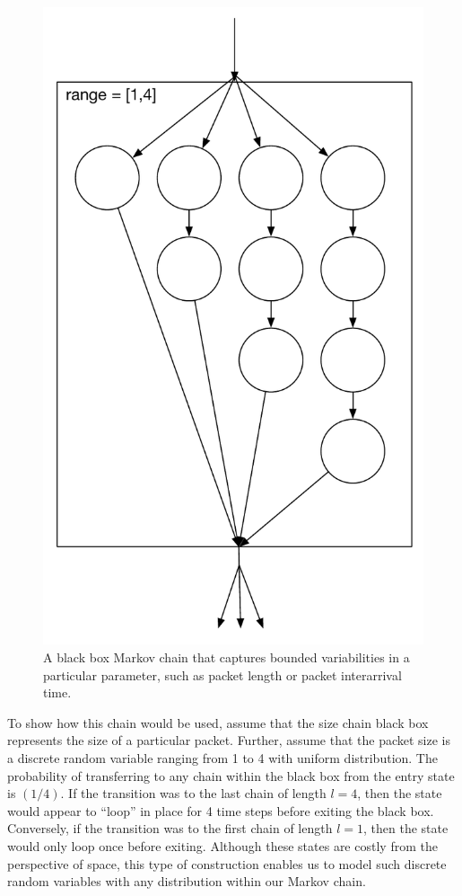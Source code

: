 \documentclass{llncs}
\begin{document}
\begin{figure}
\begin{center}
\includegraphics[scale=0.35]{../../sketches/size_chain_old.pdf}
\caption{A black box Markov chain that captures bounded variabilities in a particular parameter, such as packet length or packet interarrival time.}
\label{fig:size_chain}
\end{center}
\end{figure}

To show how this chain would be used, assume that the size chain black box represents the size of a particular packet. Further, assume that the packet size is a discrete random variable ranging from 1 to 4 with uniform distribution. The probability of transferring to any chain within the black box from the entry state is $(1/4)$. If the transition was to the last chain of length $l = 4$, then the state would appear to ``loop'' in place for 4 time steps before exiting the black box. Conversely, if the transition was to the first chain of length $l = 1$, then the state would only loop once before exiting. Although these states are costly from the perspective of space, this type of construction enables us to model such discrete random variables with any distribution within our Markov chain. 
\end{document}
